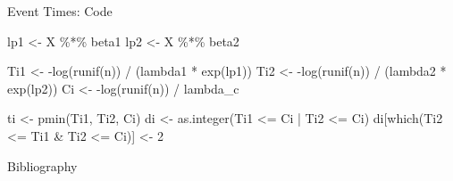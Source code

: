 \documentclass{beamer}
\newenvironment{Shaded}{\begin{snugshade}}{\end{snugshade}}
\newcommand{\DecValTok}[1]{\textcolor[rgb]{0.00,0.00,0.81}{{#1}}}
\newcommand{\SpecialCharTok}[1]{\textcolor[rgb]{0.00,0.00,0.00}{{#1}}}
\newcommand{\OtherTok}[1]{\textcolor[rgb]{0.56,0.35,0.01}{{#1}}}
\newcommand{\FunctionTok}[1]{\textcolor[rgb]{0.00,0.00,0.00}{{#1}}}
\newcommand{\NormalTok}[1]{{#1}}
\begin{document}
\begin{frame}[fragile]{Event Times: Code}
\protect\hypertarget{event-times-code}{}
\begin{Shaded}
\begin{Highlighting}[]
\NormalTok{  lp1 }\OtherTok{\textless{}{-}}\NormalTok{ X }\SpecialCharTok{\%*\%}\NormalTok{ beta1}
\NormalTok{  lp2 }\OtherTok{\textless{}{-}}\NormalTok{ X }\SpecialCharTok{\%*\%}\NormalTok{ beta2}

\NormalTok{  Ti1 }\OtherTok{\textless{}{-}} \SpecialCharTok{{-}}\FunctionTok{log}\NormalTok{(}\FunctionTok{runif}\NormalTok{(n)) }\SpecialCharTok{/}\NormalTok{ (lambda1 }\SpecialCharTok{*} \FunctionTok{exp}\NormalTok{(lp1))}
\NormalTok{  Ti2 }\OtherTok{\textless{}{-}} \SpecialCharTok{{-}}\FunctionTok{log}\NormalTok{(}\FunctionTok{runif}\NormalTok{(n)) }\SpecialCharTok{/}\NormalTok{ (lambda2 }\SpecialCharTok{*} \FunctionTok{exp}\NormalTok{(lp2))}
\NormalTok{  Ci }\OtherTok{\textless{}{-}} \SpecialCharTok{{-}}\FunctionTok{log}\NormalTok{(}\FunctionTok{runif}\NormalTok{(n)) }\SpecialCharTok{/}\NormalTok{ lambda\_c}

\NormalTok{  ti }\OtherTok{\textless{}{-}} \FunctionTok{pmin}\NormalTok{(Ti1, Ti2, Ci)}
\NormalTok{  di }\OtherTok{\textless{}{-}} \FunctionTok{as.integer}\NormalTok{(Ti1 }\SpecialCharTok{\textless{}=}\NormalTok{ Ci }\SpecialCharTok{|}\NormalTok{ Ti2 }\SpecialCharTok{\textless{}=}\NormalTok{ Ci)}
\NormalTok{  di[}\FunctionTok{which}\NormalTok{(Ti2 }\SpecialCharTok{\textless{}=}\NormalTok{ Ti1 }\SpecialCharTok{\&}\NormalTok{ Ti2 }\SpecialCharTok{\textless{}=}\NormalTok{ Ci)] }\OtherTok{\textless{}{-}} \DecValTok{2}
\end{Highlighting}
\end{Shaded}
\end{frame}


\begin{frame}{Bibliography}

\printbibliography[heading=none]

\end{frame}
\end{document}
